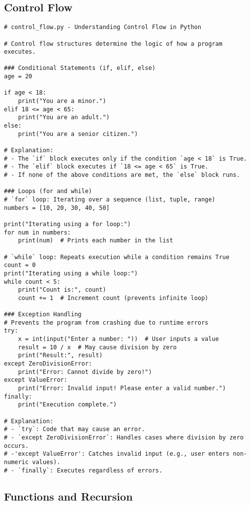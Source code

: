 \subsection{Control Flow}

\begin{verbatim}
# control_flow.py - Understanding Control Flow in Python

# Control flow structures determine the logic of how a program executes.

### Conditional Statements (if, elif, else)
age = 20

if age < 18:
    print("You are a minor.")
elif 18 <= age < 65:
    print("You are an adult.")
else:
    print("You are a senior citizen.")

# Explanation:
# - The `if` block executes only if the condition `age < 18` is True.
# - The `elif` block executes if `18 <= age < 65` is True.
# - If none of the above conditions are met, the `else` block runs.

### Loops (for and while)
# `for` loop: Iterating over a sequence (list, tuple, range)
numbers = [10, 20, 30, 40, 50]

print("Iterating using a for loop:")
for num in numbers:
    print(num)  # Prints each number in the list

# `while` loop: Repeats execution while a condition remains True
count = 0
print("Iterating using a while loop:")
while count < 5:
    print("Count is:", count)
    count += 1  # Increment count (prevents infinite loop)

### Exception Handling
# Prevents the program from crashing due to runtime errors
try:
    x = int(input("Enter a number: "))  # User inputs a value
    result = 10 / x  # May cause division by zero
    print("Result:", result)
except ZeroDivisionError:
    print("Error: Cannot divide by zero!")
except ValueError:
    print("Error: Invalid input! Please enter a valid number.")
finally:
    print("Execution complete.")

# Explanation:
# - `try`: Code that may cause an error.
# - `except ZeroDivisionError`: Handles cases where division by zero occurs.
# -'except ValueError': Catches invalid input (e.g., user enters non-numeric values).
# - `finally`: Executes regardless of errors.
\end{verbatim}

\subsection{Functions and Recursion}

